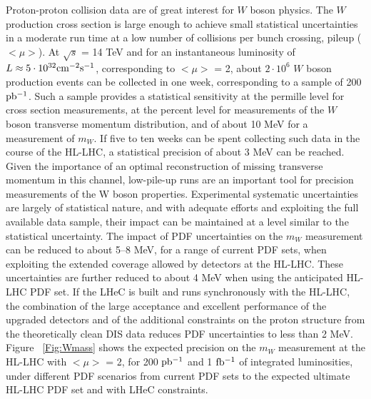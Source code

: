 \documentclass{article}
\begin{document}
Proton-proton collision data are of great interest for $W$ boson physics. The $W$ production cross section is large enough to achieve small statistical uncertainties in a moderate run time at a low number of collisions per bunch crossing, pileup ($<\mu>$). At $\sqrt{s}$ = 14 TeV and for an instantaneous luminosity of $L\approx 5\cdot 10^{32} {\rm cm^{-2}s^{-1}}$, corresponding to $<\mu>$ = 2, about $2\cdot 10^{6}$ $W$ boson production events can be collected in one week, corresponding to a sample of 200 ${\rm pb^{-1}}$. Such a sample provides a statistical sensitivity at the permille level for cross section measurements, at the percent level for measurements of the $W$ boson transverse momentum distribution, and of about 10 MeV for a measurement of $m_W$. If five to ten weeks can be spent collecting such data in the course of the HL-LHC, a statistical precision of about 3 MeV can be reached. Given the importance of an optimal reconstruction of missing transverse momentum in this channel, low-pile-up runs are an important tool for precision measurements of the W boson properties.  Experimental systematic uncertainties are largely of statistical nature, and with adequate efforts and exploiting the full available data sample, their impact can be maintained at a level similar to the statistical uncertainty. The impact of PDF uncertainties on the $m_W$ measurement can be reduced to about 5–8 MeV, for a range of current PDF sets, when exploiting the extended coverage allowed by detectors at the HL-LHC. These uncertainties are further reduced to about 4 MeV when using the anticipated HL-LHC PDF set.
If the LHeC is built and runs synchronously with the HL-LHC, the combination of the large acceptance and excellent performance of the upgraded detectors and of the additional constraints on the proton structure from the theoretically clean DIS data reduces PDF uncertainties to less than 2 MeV. Figure ~\ref{Fig:Wmass} shows the expected precision on the $m_W$ measurement at the HL-LHC with $<\mu>$ = 2, for 200 ${\rm pb^{-1}}$ and 1 ${\rm fb^{-1}}$ of integrated luminosities, under different PDF scenarios from current PDF sets to the expected ultimate HL-LHC PDF set and with LHeC constraints.
\end{document}
